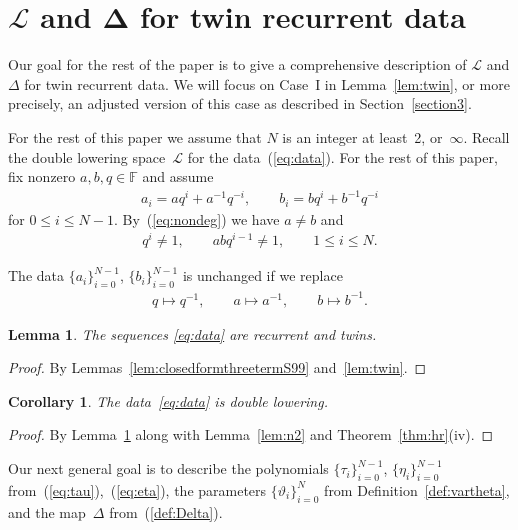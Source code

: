 \documentclass[pdftex]{sigma}
\numberwithin{equation}{section}
\newtheorem{Corollary}[Theorem]{Corollary}
\newtheorem{Lemma}[Theorem]{Lemma}
\begin{document}
\section[L and Delta for twin recurrent data]{$\boldsymbol{\mathcal L}$ and $\boldsymbol{\Delta}$ for twin recurrent data}\label{section13}

Our goal for the rest of the paper is to give a comprehensive
description of $\mathcal L$ and $\Delta$ for twin recurrent data.
We will focus on Case~I in Lemma~\ref{lem:twin}, or more precisely, an adjusted version
of this case as described in
Section~\ref{section3}.

For the rest of this paper we assume that $N$ is an
integer at least~2, or~$\infty$.
Recall the double lowering space~$\mathcal L$
for the data~(\ref{eq:data}).
For the rest of this paper, fix nonzero $a,b,q \in \mathbb F$ and assume
\begin{gather}
 a_i= a q^i + a^{-1} q^{-i},
 \qquad
b_i= b q^i + b^{-1} q^{-i}
\label{eq:aibi}
\end{gather}
for $ 0 \leq i \leq N-1$. By~(\ref{eq:nondeg}) we have
 $a \not=b$ and
\begin{gather*}
q^i \not=1, \qquad
abq^{i-1} \not=1, \qquad 1 \leq i \leq N.
\end{gather*}
\begin{Note}\label{note:qi}
The data
$\lbrace a_i \rbrace_{i=0}^{N-1}$,
$\lbrace b_i \rbrace_{i=0}^{N-1}$
is unchanged if we replace
\begin{gather*}
q \mapsto q^{-1},
\qquad
a\mapsto a^{-1},
\qquad
b\mapsto b^{-1}.
\end{gather*}
\end{Note}

\begin{Lemma}\label{lem:rtwin}
The sequences \eqref{eq:data} are recurrent and twins.
\end{Lemma}
\begin{proof}
By Lemmas~\ref{lem:closedformthreetermS99} and~\ref{lem:twin}.
\end{proof}
\begin{Corollary}
The data~\eqref{eq:data} is double lowering.
\end{Corollary}
\begin{proof}
By Lemma~\ref{lem:rtwin}
 along with
Lemma~\ref{lem:n2}
and
 Theorem~\ref{thm:hr}(iv).
\end{proof}

Our next general goal is to describe
the polynomials $\lbrace \tau_i\rbrace_{i=0}^{N-1}$,
$\lbrace \eta_i\rbrace_{i=0}^{N-1}$ from~(\ref{eq:tau}),~(\ref{eq:eta}),
the parameters $\lbrace \vartheta_i \rbrace_{i=0}^{N}$
from Definition~\ref{def:vartheta},
and the
map~$\Delta$ from~(\ref{def:Delta}).
\end{document}
